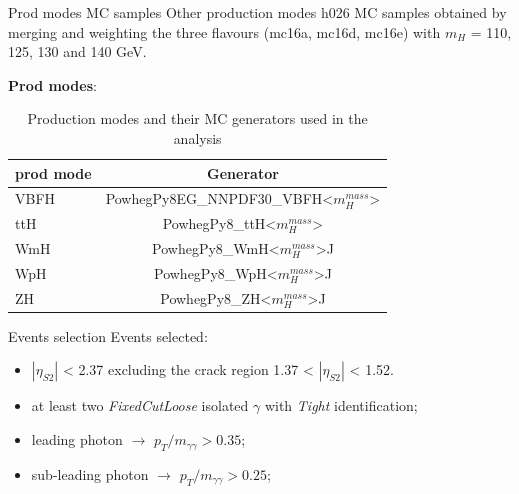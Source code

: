 \documentclass[10pt,UKenglish, leqno, xcolor = dvipsnames]{beamer}
\begin{document}
	\begin{frame}{Prod modes MC samples}
		\vfill
		Other production modes h026 MC samples obtained by merging and weighting the three flavours (mc16a, mc16d, mc16e) with $m_H$ = 110, 125, 130 and 140 GeV.
		
		\vspace{.5cm}
		\textbf{Prod modes}:
		\begin{table}[tbp]
			\centering
			\begin{tabular}{lc}
				\toprule[1.5pt]
				prod mode	& Generator	\\
				\midrule
				VBFH 	& PowhegPy8EG\_NNPDF30\_VBFH<$m_{H}^{mass}$>	\\
				ttH		& PowhegPy8\_ttH<$m_{H}^{mass}$>	\\
				WmH		& PowhegPy8\_WmH<$m_{H}^{mass}$>J	\\
				WpH		& PowhegPy8\_WpH<$m_{H}^{mass}$>J	\\
				ZH 		& PowhegPy8\_ZH<$m_{H}^{mass}$>J	\\
				\bottomrule[1.5pt]
			\end{tabular}
			\caption{Production modes and their MC generators used in the analysis}
		\end{table} 
		\vfill
	\end{frame}
	
	\begin{frame}{Events selection}
		\vfill
		Events selected:
		\begin{itemize}
			\item $|\eta_{S2}|$ < 2.37 excluding the crack region 1.37 < $|\eta_{S2}|$ < 1.52.
			\item at least two \textit{FixedCutLoose} isolated $\gamma$ with \textit{Tight} identification;
			\item leading photon $\rightarrow$ $p_T/m_{\gamma\gamma} > 0.35$;
			\item sub-leading photon $\rightarrow$ $p_T/m_{\gamma\gamma} > 0.25$;
		\end{itemize}
		
		\vspace{0.5cm}
		\vfill
	\end{frame}
\end{document}
